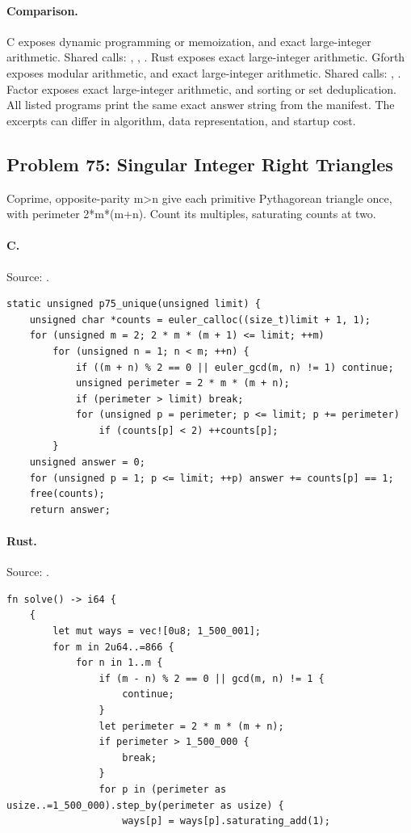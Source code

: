 \paragraph{Comparison.}
C exposes dynamic programming or memoization, and exact large-integer arithmetic. Shared calls: \texttt{}, \texttt{}, \texttt{}. Rust exposes exact large-integer arithmetic. Gforth exposes modular arithmetic, and exact large-integer arithmetic. Shared calls: \texttt{}, \texttt{}. Factor exposes exact large-integer arithmetic, and sorting or set deduplication.
All listed programs print the same exact answer string from the manifest. The excerpts can differ in algorithm, data representation, and startup cost.

\subsection{Problem 75: Singular Integer Right Triangles}
\label{walkthrough:p75}
Coprime, opposite-parity m>n give each primitive Pythagorean triangle once, with perimeter 2*m*(m+n). Count its multiples, saturating counts at two.

\paragraph{C.} Source: .
\begin{lstlisting}
static unsigned p75_unique(unsigned limit) {
    unsigned char *counts = euler_calloc((size_t)limit + 1, 1);
    for (unsigned m = 2; 2 * m * (m + 1) <= limit; ++m)
        for (unsigned n = 1; n < m; ++n) {
            if ((m + n) % 2 == 0 || euler_gcd(m, n) != 1) continue;
            unsigned perimeter = 2 * m * (m + n);
            if (perimeter > limit) break;
            for (unsigned p = perimeter; p <= limit; p += perimeter)
                if (counts[p] < 2) ++counts[p];
        }
    unsigned answer = 0;
    for (unsigned p = 1; p <= limit; ++p) answer += counts[p] == 1;
    free(counts);
    return answer;
\end{lstlisting}

\paragraph{Rust.} Source: .
\begin{lstlisting}
fn solve() -> i64 {
    {
        let mut ways = vec![0u8; 1_500_001];
        for m in 2u64..=866 {
            for n in 1..m {
                if (m - n) % 2 == 0 || gcd(m, n) != 1 {
                    continue;
                }
                let perimeter = 2 * m * (m + n);
                if perimeter > 1_500_000 {
                    break;
                }
                for p in (perimeter as usize..=1_500_000).step_by(perimeter as usize) {
                    ways[p] = ways[p].saturating_add(1);
\end{lstlisting}

